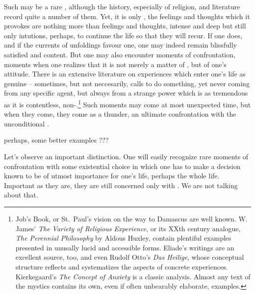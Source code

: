 \pa Such  may be a rare , although the
history, especially of religion, and literature record quite a number
of them.  Yet, it is only , the feelings and
thoughts which it provokes are nothing more than feelings and
thoughts, intense and deep but still only  intutions,
perhaps,   to continue the life so that
they will recur.  If one does, and if the  currents of
 unfoldings favour one, one may indeed remain blissfully
satisfied and content.  But one may also encounter moments of
confrontation, moments when one realizes that it is not merely a
matter of , but of one's attitude. 
There is an extensive literature on experiences which enter one's life
as genuine  -- sometimes, but not neccesarily, calls to do
something, yet never coming from any specific agent, but always from a
strange power which is as tremendous as it is contentless,
non-.\footnote{\label{ft:mysticexp}Job's Book, or
St.~Paul's vision on the way to Damascus are well known.  W. James'
{\em The Variety of Religious Experience}, or its XXth century
analogue, {\em The Perennial Philosophy} by Aldous Huxley, contain
plentiful examples presented in unusally lucid and accessible forms. 
Eliade's writings are an excellent source, too, and even Rudolf Otto's
{\em Das Heilige}, whose conceptual structure reflects and 
systematizes the aspects
of concrete experiences.  Kierkegaard's {\em The Concept of
Anxiety} is a classic analysis.  Almost any text of the mystics
contains its own, even if often unbearably elaborate, examples.}
%
Such moments may come at most unexpected time, but when they come,
they come as a thunder, an ultimate confrontation with the
unconditional .

\pa
{} 

perhaps, some better examples ???


\pa\label{pa:exAbsChoice}
Let's observe an important distinction. One will easily recognize rare 
moments of confrontation with some existential choice in which one 
has to make a decision known to be of utmost importance for one's life, 
perhaps the whole life. Important as they are, they are still concerned 
only with . We are not talking about that. 

